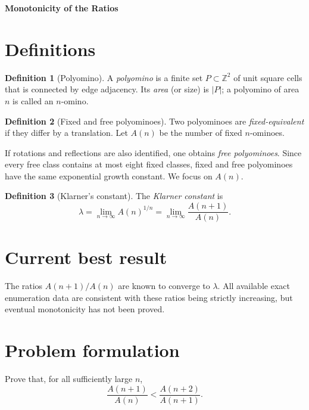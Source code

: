 \documentclass[11pt,a4paper]{article}
\theoremstyle{definition}
\newtheorem{definition}{Definition}
\newcommand{\A}{A}
\newcommand{\klarner}{\lambda}
\begin{document}
\begin{center}
  {\Large\bfseries Monotonicity of the Ratios}
\end{center}
\section{Definitions}
\begin{definition}[Polyomino]
A \emph{polyomino} is a finite set $P\subset \mathbb Z^2$ of unit square cells that is
connected by edge adjacency.  Its \emph{area} (or size) is $|P|$; a polyomino of
area $n$ is called an $n$-omino.
\end{definition}

\begin{definition}[Fixed and free polyominoes]
Two polyominoes are \emph{fixed-equivalent} if they differ by a translation.  Let
$\A(n)$ be the number of fixed $n$-ominoes.  
\end{definition}

If rotations and reflections are also
identified, one obtains \emph{free polyominoes}.  Since every free class contains at
most eight fixed classes, fixed and free polyominoes have the same exponential growth
constant.  We focus on $\A(n)$.

\begin{definition}[Klarner's constant]
The \emph{Klarner constant} is
\begin{equation}\label{eq:klarner}
 \klarner
 =\lim_{n\to\infty}\A(n)^{1/n}
 =\lim_{n\to\infty}\frac{\A(n+1)}{\A(n)}.
\end{equation}
\end{definition}


\section{Current best result}
The ratios $\A(n+1)/\A(n)$ are known to converge to $\klarner$. All available exact
enumeration data are consistent with these ratios being strictly increasing, but
eventual monotonicity has not been proved.

\section{Problem formulation}

Prove that, for all sufficiently large $n$,
\begin{equation}
  \frac{\A(n+1)}{\A(n)}
  <
  \frac{\A(n+2)}{\A(n+1)}.
\end{equation}
\end{document}
